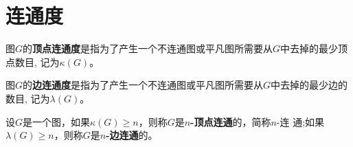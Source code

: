 \chapter{连通度}
  \begin{Def}
    图$G$的{\bfseries 顶点连通度}是指为了产生一个不连通图或平凡图所需要从$G$中去掉的最少顶点数目, 记为$\kappa (G)$。
  \end{Def}
  \begin{Def}
    图$G$的{\bfseries 边连通度}是指为了产生一个不连通图或平凡图所需要从$G$中去掉的最少边的数目, 记为$\lambda (G)$。
  \end{Def}
  \begin{Def}
    设$G$是一个图，如果$\kappa (G) \geq n$，则称$G$是{\bfseries $n$-顶点连通}的，简称$n$-连
    通;如果$\lambda (G) \geq n$，则称$G$是{\bfseries $n$-边连通}的。
  \end{Def}

